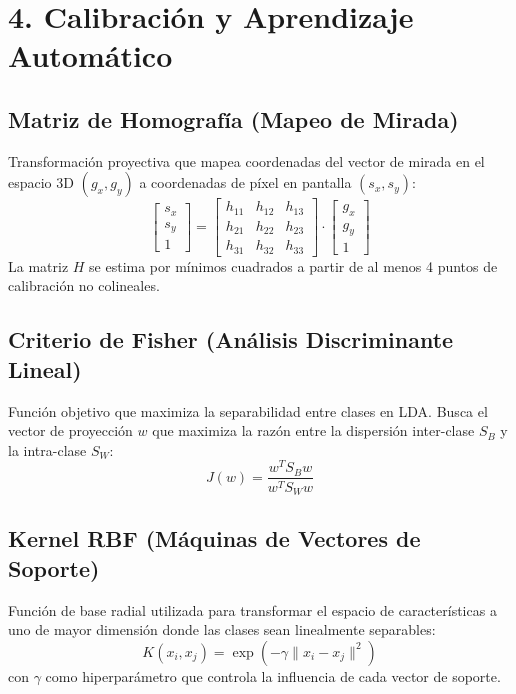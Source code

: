 \section*{4. Calibración y Aprendizaje Automático}

\subsection*{Matriz de Homografía (Mapeo de Mirada)}
Transformación proyectiva que mapea coordenadas del vector de mirada en el espacio 3D $(g_x, g_y)$ a coordenadas de píxel en pantalla $(s_x, s_y)$:
\begin{equation}
	\begin{bmatrix} s_x \\ s_y \\ 1 \end{bmatrix} = 
	\begin{bmatrix} 
		h_{11} & h_{12} & h_{13} \\ 
		h_{21} & h_{22} & h_{23} \\ 
		h_{31} & h_{32} & h_{33} 
	\end{bmatrix} 
	\cdot 
	\begin{bmatrix} g_x \\ g_y \\ 1 \end{bmatrix}
	\label{eq:anexo_homografia}
\end{equation}
La matriz $H$ se estima por mínimos cuadrados a partir de al menos 4 puntos de calibración no colineales.

\subsection*{Criterio de Fisher (Análisis Discriminante Lineal)}
Función objetivo que maximiza la separabilidad entre clases en LDA. Busca el vector de proyección $w$ que maximiza la razón entre la dispersión inter-clase $S_B$ y la intra-clase $S_W$:
\begin{equation}
	J(w) = \frac{w^T S_B w}{w^T S_W w}
	\label{eq:anexo_fisher}
\end{equation}

\subsection*{Kernel RBF (Máquinas de Vectores de Soporte)}
Función de base radial utilizada para transformar el espacio de características a uno de mayor dimensión donde las clases sean linealmente separables:
\begin{equation}
	K(x_i, x_j) = \exp\left(-\gamma \|x_i - x_j\|^2\right)
	\label{eq:anexo_rbf}
\end{equation}
con $\gamma$ como hiperparámetro que controla la influencia de cada vector de soporte.

